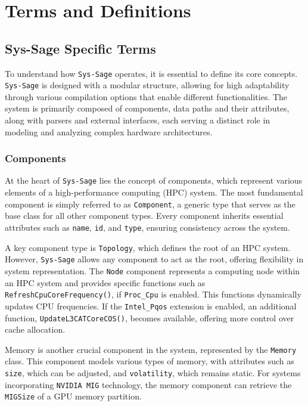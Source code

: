 \chapter{Terms and Definitions}\label{chapter:terms_and_definition}

\section{Sys-Sage Specific Terms}

To understand how \texttt{Sys-Sage} operates, it is essential to define its core concepts. \texttt{Sys-Sage} is designed with a modular structure, allowing for high adaptability through various compilation options that enable different functionalities. The system is primarily composed of components, data paths and their attributes, along with parsers and external interfaces, each serving a distinct role in modeling and analyzing complex hardware architectures.

\subsection{Components }

At the heart of \texttt{Sys-Sage} lies the concept of components, which represent various elements of a high-performance computing (\ac{HPC}) system. The most fundamental component is simply referred to as \texttt{Component}, a generic type that serves as the base class for all other component types. Every component inherits essential attributes such as \texttt{name}, \texttt{id}, and \texttt{type}, ensuring consistency across the system. \cite[see Component]{sys-sage-docu}

A key component type is \texttt{Topology}, which defines the root of an \ac{HPC} system. However, \texttt{Sys-Sage} allows any component to act as the root, offering flexibility in system representation. The \texttt{Node} component represents a computing node within an \ac{HPC} system and provides specific functions such as \texttt{RefreshCpuCoreFrequency()}, if \texttt{Proc\_Cpu} is enabled. This functions dynamically updates CPU frequencies. If the \texttt{Intel\_Pqos} extension is enabled, an additional function, \texttt{UpdateL3CATCoreCOS()}, becomes available, offering more control over cache allocation. \cite[see Topology, Node]{sys-sage-docu}

Memory is another crucial component in the system, represented by the \texttt{Memory} class. This component models various types of memory, with attributes such as \texttt{size}, which can be adjusted, and \texttt{volatility}, which remains static. For systems incorporating \texttt{NVIDIA MIG} technology, the memory component can retrieve the \texttt{MIGSize} of a \ac{GPU} memory partition. \cite[see Memory]{sys-sage-docu}

